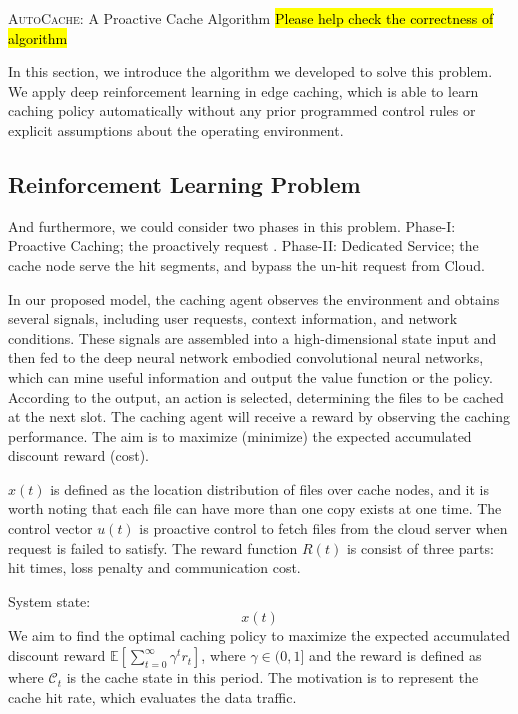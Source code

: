 \documentclass{article}
\begin{document}
\begin{section}{\textsc{AutoCache}: A Proactive Cache Algorithm}
    \label{algorithm}
    \hl{Please help check the correctness of algorithm}

    In this section, we introduce the algorithm we developed to solve this problem.
    We apply deep reinforcement learning in edge caching, which is able to learn caching policy automatically without any prior programmed control rules or explicit assumptions about the operating environment.

    \subsection{Reinforcement Learning Problem}
    And furthermore, we could consider two phases in this problem.
    Phase-I: Proactive Caching; the proactively request .
    Phase-II: Dedicated Service; the cache node serve the hit segments, and bypass the un-hit request from Cloud.

    In our proposed model, the caching agent observes the environment and obtains several signals, including user requests, context information, and network conditions. These signals are assembled into a high-dimensional state input and then fed to the deep neural network embodied convolutional neural networks, which can mine useful information and output the value function or the policy. According to the output, an action is selected, determining the files to be cached at the next slot. The caching agent will receive a reward by observing the caching performance. The aim is to maximize (minimize) the expected accumulated discount reward (cost).

    $x(t)$ is defined as the location distribution of files over cache nodes, and it is worth noting that each file can have more than one copy exists at one time.
    The control vector $u(t)$ is proactive control to fetch files from the cloud server when request is failed to satisfy.
    The reward function $R(t)$ is consist of three parts: hit times, loss penalty and communication cost.

    System state:
    $$
    x(t)
    $$
    We aim to find the optimal caching policy to maximize the expected accumulated discount reward $\mathbb{E}\left[\sum_{t=0}^{\infty}\gamma^tr_t\right]$, where $\gamma\in(0,1]$ and the reward is defined as where $\mathcal{C}_t$ is the cache state in this period. The motivation is to represent the cache hit rate, which evaluates the data traffic.


\end{section}
\end{document}
